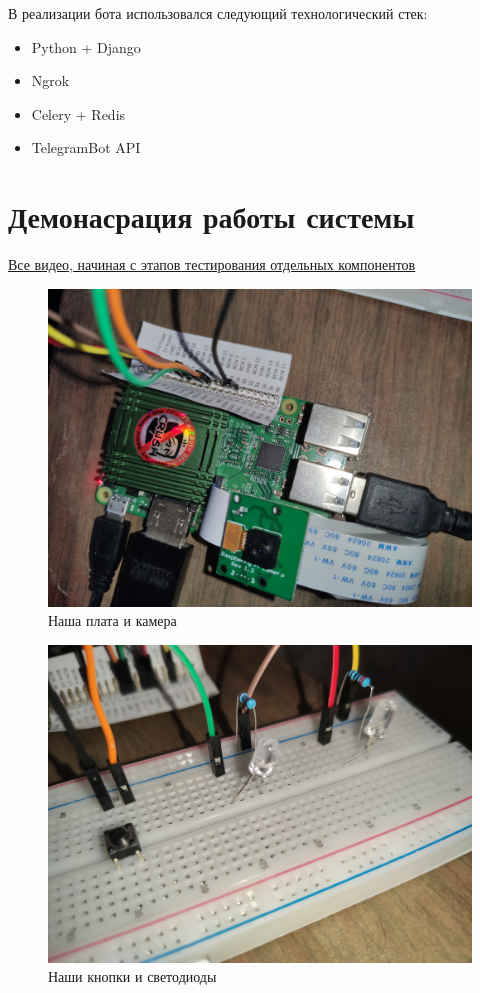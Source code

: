\documentclass[a4paper,11pt]{article}
\begin{document}
\noindent В реализации бота использовался следующий технологический стек:
\begin{itemize}
  \item Python + Django
  \item Ngrok
  \item Celery + Redis
  \item TelegramBot API
\end{itemize}

\section{Демонасрация работы системы}
\href{https://drive.google.com/drive/u/0/folders/17Fis1vASnBp3RG1X3LoO70RmMCvE8m6c}{Все видео, начиная с этапов тестирования отдельных компонентов}
\begin{figure}[h!]
  \begin{center}
    \includegraphics[scale=0.15]{images/апп_1.jpg}
  \caption{Наша плата и камера}
  \end{center}
\end{figure}
\begin{figure}[h!]
  \begin{center}
    \includegraphics[scale=0.15]{images/апп_2.jpg}
  \caption{Наши кнопки и светодиоды}
  \end{center}
\end{figure}
\end{document}
